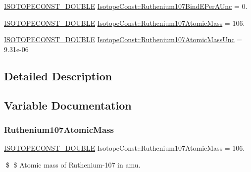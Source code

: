 \begin{DoxyCompactItemize}
\mbox{\hyperlink{group___isotope_const-_macros_ga8f45a7272ce02c0b4c65c44636ed719a}{I\+S\+O\+T\+O\+P\+E\+C\+O\+N\+S\+T\+\_\+\+D\+O\+U\+B\+LE}} \mbox{\hyperlink{group___isotope_const-_ruthenium-_ru107_ga294f910450b23920cbda575f7a917739}{Isotope\+Const\+::\+Ruthenium107\+Bind\+E\+Per\+A\+Unc}} = 0.
\item 
\mbox{\hyperlink{group___isotope_const-_macros_ga8f45a7272ce02c0b4c65c44636ed719a}{I\+S\+O\+T\+O\+P\+E\+C\+O\+N\+S\+T\+\_\+\+D\+O\+U\+B\+LE}} \mbox{\hyperlink{group___isotope_const-_ruthenium-_ru107_ga176c6dbc035b09eb2f0426b24b4c1f2a}{Isotope\+Const\+::\+Ruthenium107\+Atomic\+Mass}} = 106.
\item 
\mbox{\hyperlink{group___isotope_const-_macros_ga8f45a7272ce02c0b4c65c44636ed719a}{I\+S\+O\+T\+O\+P\+E\+C\+O\+N\+S\+T\+\_\+\+D\+O\+U\+B\+LE}} \mbox{\hyperlink{group___isotope_const-_ruthenium-_ru107_gae49aa0931143a0454ae5e7af0315c5fc}{Isotope\+Const\+::\+Ruthenium107\+Atomic\+Mass\+Unc}} = 9.\+31e-\/06
\end{DoxyCompactItemize}


\subsection{Detailed Description}


\subsection{Variable Documentation}
\mbox{\label{group___isotope_const-_ruthenium-_ru107_ga176c6dbc035b09eb2f0426b24b4c1f2a}} 
\subsubsection{\texorpdfstring{Ruthenium107\+Atomic\+Mass}{Ruthenium107AtomicMass}}
{\footnotesize\ttfamily \mbox{\hyperlink{group___isotope_const-_macros_ga8f45a7272ce02c0b4c65c44636ed719a}{I\+S\+O\+T\+O\+P\+E\+C\+O\+N\+S\+T\+\_\+\+D\+O\+U\+B\+LE}} Isotope\+Const\+::\+Ruthenium107\+Atomic\+Mass = 106.}

\$ \$ Atomic mass of Ruthenium-\/107 in amu. \mbox{\label{group___isotope_const-_ruthenium-_ru107_gae49aa0931143a0454ae5e7af0315c5fc}} 
